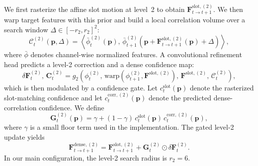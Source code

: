We first rasterize the affine slot motion at level~2 to obtain $\mathbf{F}^{\mathrm{slot},(2)}_{t\rightarrow t+1}$. We then warp target features with this prior and build a local correlation volume over a search window $\Delta \in [-r_2,r_2]^2$:
\begin{equation}
\label{eq:l2_corr}
\mathcal{C}_t^{(2)}(\mathbf{p},\Delta) = \left\langle \bar{\phi}_t^{(2)}(\mathbf{p}),\, \bar{\phi}_{t+1}^{(2)}\left(\mathbf{p} + \mathbf{F}^{\mathrm{slot},(2)}_{t\rightarrow t+1}(\mathbf{p}) + \Delta\right) \right\rangle,
\end{equation}
where $\bar{\phi}$ denotes channel-wise normalized features. A convolutional refinement head predicts a level-2 correction and a dense confidence map:
\begin{equation}
\delta \mathbf{F}_t^{(2)},\, \mathbf{C}_t^{(2)} = g_2\left(\phi_t^{(2)},\, \mathrm{warp}(\phi_{t+1}^{(2)},\mathbf{F}^{\mathrm{slot},(2)}),\, \mathbf{F}^{\mathrm{slot},(2)},\, \mathcal{C}_t^{(2)}\right),
\end{equation}
which is then modulated by a confidence gate. Let $c^{\mathrm{slot}}_t(\mathbf{p})$ denote the rasterized slot-matching confidence and let $c^{\mathrm{corr},(2)}_t(\mathbf{p})$ denote the predicted dense-correlation confidence. We define
\begin{equation}
\mathbf{G}^{(2)}_t(\mathbf{p}) = \gamma + (1-\gamma)\,c^{\mathrm{slot}}_t(\mathbf{p})\,c^{\mathrm{corr},(2)}_t(\mathbf{p}),
\end{equation}
where $\gamma$ is a small floor term used in the implementation. The gated level-2 update yields
\begin{equation}
\mathbf{F}^{\mathrm{dense},(2)}_{t\rightarrow t+1} = \mathbf{F}^{\mathrm{slot},(2)}_{t\rightarrow t+1} + \mathbf{G}^{(2)}_t \odot \delta \mathbf{F}_t^{(2)}.
\end{equation}
In our main configuration, the level-2 search radius is $r_2=6$.

